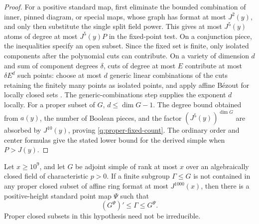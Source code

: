 \begin{proof}
For a positive standard map, first eliminate the bounded combination of
inner, pinned diagram, or special maps, whose graph has format at most
$J^2(y)$, and only then substitute the single split field power.  This
gives at most $J^5(y)$ atoms of degree at most $J^5(y)P$ in the fixed-point
test.  On a conjunction piece, the inequalities specify an open subset.
Since the fixed set is finite, only isolated components after the
polynomial cuts can contribute.  On a variety of dimension $d$ and sum of
component degrees $\delta$, cuts of degree at most $E$ contribute at most
$\delta E^d$ such points: choose at most $d$ generic linear combinations
of the cuts retaining the finitely many points as isolated points, and
apply affine B\'ezout for locally closed sets \citep[Definition~3, Proposition~2.9 and Theorem~2.14]{PardoSebastian2020}.  The generic-combinations step supplies the exponent $d$ locally.  For a proper subset of $G$, $d\le\dim G-1$.
The degree bound obtained from $a(y)$, the number of Boolean pieces, and
the factor $(J^5(y))^{\dim G}$ are absorbed by $J^{10}(y)$, proving
\eqref{q:proper-fixed-count}.  The ordinary order and center formulas give
the stated lower bound for the derived simple when $P>J(y)$.
\end{proof}

\begin{proposition}\label{q:genericity}
Let $x\ge10^9$, and let $G$ be adjoint simple of rank at most $x$ over an
algebraically closed field of characteristic $p>0$.  If a finite subgroup
$\Gamma\le G$ is not contained in any proper closed subset of affine ring
format at most $J^{1000}(x)$, then there is a positive-height standard point
map $\Psi$ such that
\begin{equation}\label{q:sandwich}
                   (G^\Psi)'\le\Gamma\le G^\Psi.
\end{equation}
Proper closed subsets in this hypothesis need not be irreducible.
\end{proposition}


